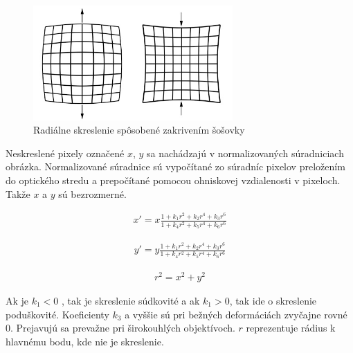 \begin{figure}[h]
	\centering
	\includegraphics[width=0.68\textwidth]{figures/radial_distortion.jpg} 
	\caption{Radiálne skreslenie spôsobené zakrivením šošovky}
	\label{fig:radial_distortion}
\end{figure}

Neskreslené pixely označené $x$, $y$ sa nachádzajú v normalizovaných súradniciach obrázka. Normalizované súradnice sú vypočítané zo súradníc pixelov preložením do optického stredu a prepočítané pomocou ohniskovej vzdialenosti v pixeloch. Takže $x$ a $y$ sú bezrozmerné.

\begin{equation}
\label{eq::radial_dist::a}
\begin{aligned}
x'= x \frac{1 + k_{1}r^{2} + k_{2}r^{4} + k_{3}r^{6}}{1 + k_{4}r^{2} + k_{5}r^{4} + k_{6}r^{6}}
\end{aligned}
\end{equation}

\begin{equation}
\label{eq::radial_dist::b}
\begin{aligned}
y'= y \frac{1 + k_{1}r^{2} + k_{2}r^{4} + k_{3}r^{6}}{1 + k_{4}r^{2} + k_{5}r^{4} + k_{6}r^{6}}
\end{aligned}
\end{equation}

\begin{equation}
\label{eq::radial_dist::c}
\begin{aligned}
r^2=x^2+y^2
\end{aligned}
\end{equation}

Ak je $k_1<0$ , tak je skreslenie súdkovité a ak $k_1> 0$, tak ide o skreslenie poduškovité. Koeficienty $k_3$ a vyššie sú pri bežných deformáciách zvyčajne rovné 0. Prejavujú sa prevažne pri širokouhlých objektívoch. $r$ reprezentuje rádius k hlavnému bodu, kde nie je skreslenie.  

